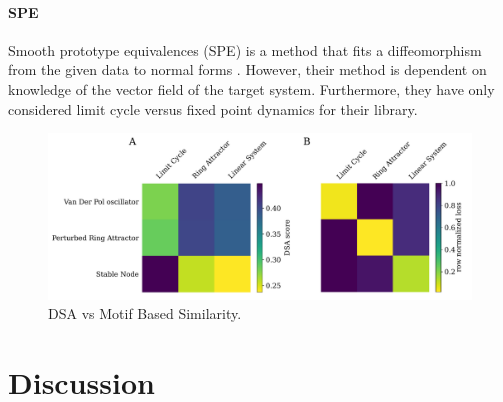 \documentclass{article}
\theoremstyle{definition} \newtheorem{definition}{Definition}  \newtheorem{example}{Example}
\theoremstyle{remark} \newtheorem{remark}{Remark}
\newcounter{ct}
\begin{document}


\paragraph{SPE}
Smooth prototype equivalences (SPE) is a method that fits a diffeomorphism from the given data to normal forms \citep{friedman2025characterizing}.
However, their method is dependent on knowledge of the vector field of the target system.
Furthermore, they have only considered limit cycle versus fixed point dynamics for their library.



\begin{figure}[htbp]
    \centering
    \includegraphics[width=0.75\linewidth]{dsa_vs_mbs}
    \caption{DSA vs Motif Based Similarity.}
    \label{fig:ds_vs_mbs}
\end{figure}




\section{Discussion}
\end{document}
